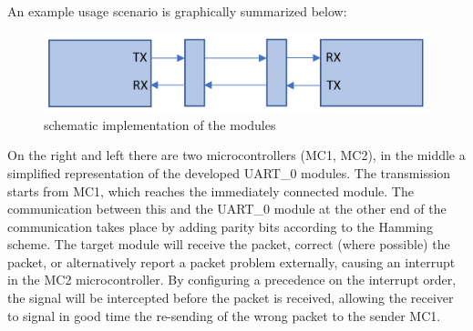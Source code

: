 \documentclass[11pt]{article}
\begin{document}
	An example usage scenario is graphically summarized below:\\
	\begin{figure}[H]
	\begin{center}
		\includegraphics[scale=0.35]{diagram 1}	
		\caption{schematic implementation of the modules}	
	\end{center}
	\end{figure}
	On the right and left there are two microcontrollers (MC1, MC2), in the middle a simplified representation of the developed UART\_0 modules. The transmission starts from MC1, which reaches the immediately connected module. The communication between this and the UART\_0 module at the other end of the communication takes place by adding parity bits according to the Hamming scheme. The target module will receive the packet, correct (where possible) the packet, or alternatively report a packet problem externally, causing an interrupt in the MC2 microcontroller. By configuring a precedence on the interrupt order, the signal will be intercepted before the packet is received, allowing the receiver to signal in good time the re-sending of the wrong packet to the sender MC1.
	
\end{document}
